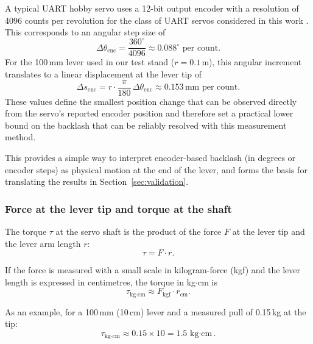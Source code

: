 \documentclass[11pt,letterpaper]{article}
\begin{document}
A typical UART hobby servo uses a 12-bit output encoder with a resolution of 4096 counts per revolution for the class of UART servos considered in this work \cite{feetech_specification,waveshare_manual}. This corresponds to an angular step size of
\begin{equation}
    \Delta\theta_{\text{enc}} = \frac{360^\circ}{4096} \approx 0.088^\circ \text{ per count}.
\end{equation}
For the 100\,mm lever used in our test stand ($r = 0.1\,\text{m}$), this angular increment translates to a linear displacement at the lever tip of
\begin{equation}
    \Delta s_{\text{enc}} = r \cdot \frac{\pi}{180} \,\Delta\theta_{\text{enc}} \approx 0.153\,\text{mm per count}.
\end{equation}
These values define the smallest position change that can be observed directly from the servo’s reported encoder position and therefore set a practical lower bound on the backlash that can be reliably resolved with this measurement method.

This provides a simple way to interpret encoder-based backlash (in degrees or encoder steps) as physical motion at the end of the lever, and forms the basis for translating the results in Section~\ref{sec:validation}.

\subsubsection{Force at the lever tip and torque at the shaft}
\label{subsubsec:force-torque}

The torque $\tau$ at the servo shaft is the product of the force $F$ at the lever tip and the lever arm length $r$:
\begin{equation}
    \tau = F \cdot r.
\end{equation}

If the force is measured with a small scale in kilogram-force (kgf) and the lever length is expressed in centimetres, the torque in kg$\cdot$cm is
\begin{equation}
    \tau_{\text{kg$\cdot$cm}} \approx F_{\text{kgf}} \cdot r_{\text{cm}}.
\end{equation}

As an example, for a 100\,mm (10\,cm) lever and a measured pull of 0.15\,kg at the tip:
\begin{equation}
    \tau_{\text{kg$\cdot$cm}} \approx 0.15 \times 10 = 1.5\,\text{kg$\cdot$cm}.
\end{equation}
\end{document}
